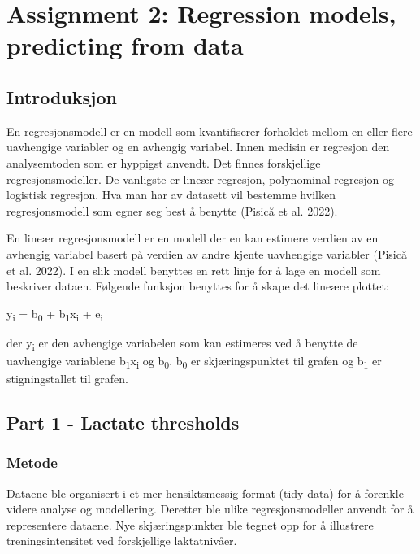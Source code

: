 \documentclass[
  letterpaper,
  DIV=11,
  numbers=noendperiod]{scrreprt}
\begin{document}

\chapter{Assignment 2: Regression models, predicting from
data}\label{assignment-2-regression-models-predicting-from-data}

\section{Introduksjon}\label{introduksjon-1}

En regresjonsmodell er en modell som kvantifiserer forholdet mellom en
eller flere uavhengige variabler og en avhengig variabel. Innen medisin
er regresjon den analysemtoden som er hyppigst anvendt. Det finnes
forskjellige regresjonsmodeller. De vanligste er lineær regresjon,
polynominal regresjon og logistisk regresjon. Hva man har av datasett
vil bestemme hvilken regresjonsmodell som egner seg best å benytte
(Pisică et al. 2022).

En lineær regresjonsmodell er en modell der en kan estimere verdien av
en avhengig variabel basert på verdien av andre kjente uavhengige
variabler (Pisică et al. 2022). I en slik modell benyttes en rett linje
for å lage en modell som beskriver dataen. Følgende funksjon benyttes
for å skape det lineære plottet:

y\textsubscript{i} = b\textsubscript{0} +
b\textsubscript{1}x\textsubscript{i} + e\textsubscript{i}

der y\textsubscript{i} er den avhengige variabelen som kan estimeres ved
å benytte de uavhengige variablene b\textsubscript{1}x\textsubscript{i}
og b\textsubscript{0}. b\textsubscript{0} er skjæringspunktet til grafen
og b\textsubscript{1} er stigningstallet til grafen.

\section{Part 1 - Lactate thresholds}\label{part-1---lactate-thresholds}

\subsection{Metode}\label{metode-2}

Dataene ble organisert i et mer hensiktsmessig format (tidy data) for å
forenkle videre analyse og modellering. Deretter ble ulike
regresjonsmodeller anvendt for å representere dataene. Nye
skjæringspunkter ble tegnet opp for å illustrere treningsintensitet ved
forskjellige laktatnivåer.
\end{document}
